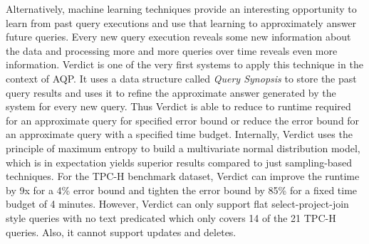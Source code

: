 Alternatively, machine learning techniques provide an interesting opportunity to learn from past query executions and use that learning to approximately answer future queries.
Every new query execution reveals some new information about the data and processing more and more queries over time reveals even more information.
Verdict \cite{verdict} is one of the very first systems to apply this technique in the context of AQP.
It uses a data structure called \textit{Query Synopsis} to store the past query results and uses it to refine the approximate answer generated by the system for every new query.
Thus Verdict is able to reduce to runtime required for an approximate query for specified error bound or reduce the error bound for an approximate query with a specified time budget.
Internally, Verdict uses the principle of maximum entropy to build a multivariate normal distribution model, which is in expectation yields superior results compared to just sampling-based techniques.
For the TPC-H benchmark dataset, Verdict can improve the runtime by 9x for a 4\% error bound and tighten the error bound by 85\% for a fixed time budget of 4 minutes.
However, Verdict can only support flat select-project-join style queries with no text predicated which only covers 14 of the 21 TPC-H queries.
Also, it cannot support updates and deletes.



